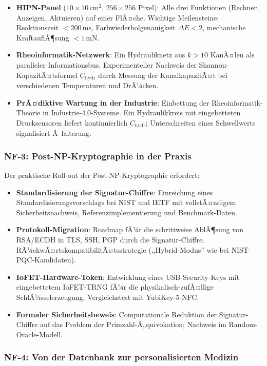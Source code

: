 ﻿\documentclass[a4paper,12pt]{scrreprt}
\theoremstyle{definition}
\begin{document}
\begin{itemize}
  \item \textbf{HIPN-Panel} ($10 \times 10$\,cm$^2$, $256 \times 256$
    Pixel): Alle drei Funktionen (Rechnen, Anzeigen, Aktuieren) auf
    einer FlÃ¤che. Wichtige Meilensteine: Reaktionszeit $< 200$\,ms,
    Farbwiederholgenauigkeit $\Delta E < 2$, mechanische KraftauflÃ¶sung
    $< 1$\,mN.
  \item \textbf{Rheoinformatik-Netzwerk}: Ein Hydrauliknetz aus
    $k > 10$ KanÃ¤len als paralleler Informationsbus. Experimenteller
    Nachweis der Shannon-KapazitÃ¤tsformel $C_\mathrm{hydr}$ durch
    Messung der KanalkapazitÃ¤t bei verschiedenen Temperaturen und
    DrÃ¼cken.
  \item \textbf{PrÃ¤diktive Wartung in der Industrie}: Einbettung der
    Rheoinformatik-Theorie in Industrie-4.0-Systeme. Ein Hydraulikkreis
    mit eingebetteten Drucksensoren liefert kontinuierlich $C_\mathrm{hydr}$;
    Unterschreiten eines Schwellwerts signalisiert Ã–lalterung.
\end{itemize}

\subsubsection{NF-3: Post-NP-Kryptographie in der Praxis}

Der praktische Roll-out der Post-NP-Kryptographie erfordert:
\begin{itemize}
  \item \textbf{Standardisierung der Signatur-Chiffre}: Einreichung
    eines Standardisierungsvorschlags bei NIST und IETF mit vollstÃ¤ndigem
    Sicherheitsnachweis, Referenzimplementierung und Benchmark-Daten.
  \item \textbf{Protokoll-Migration}: Roadmap fÃ¼r die schrittweise
    AblÃ¶sung von RSA/ECDH in TLS, SSH, PGP durch die Signatur-Chiffre.
    RÃ¼ckwÃ¤rtskompatibilitÃ¤tsstrategie (,,Hybrid-Modus'' wie bei
    NIST-PQC-Kandidaten).
  \item \textbf{IoFET-Hardware-Token}: Entwicklung eines USB-Security-Keys
    mit eingebettetem IoFET-TRNG fÃ¼r die physikalisch-zufÃ¤llige
    SchlÃ¼sselerzeugung. Vergleichstest mit YubiKey-5-NFC.
  \item \textbf{Formaler Sicherheitsbeweis}: Computationale Reduktion der
    Signatur-Chiffre auf das Problem der Primzahl-Ã„quivokation; Nachweis
    im Random-Oracle-Modell.
\end{itemize}

\subsubsection{NF-4: Von der Datenbank zur personalisierten Medizin}
\end{document}
